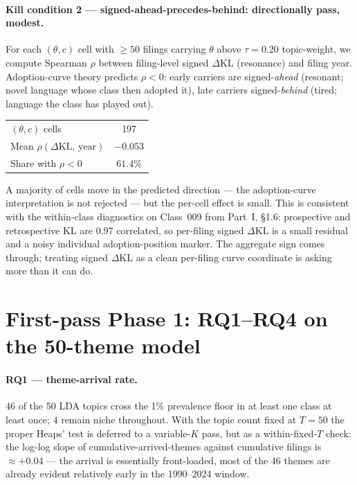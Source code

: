 \documentclass[11pt]{report}
\begin{document}
\paragraph{Kill condition 2 --- signed-ahead-precedes-behind: directionally pass, modest.}
For each $(\theta, c)$ cell with $\geq 50$ filings carrying $\theta$ above
$\tau = 0.20$ topic-weight, we compute Spearman $\rho$ between filing-level
signed $\Delta\mathrm{KL}$ (resonance) and filing year. Adoption-curve theory
predicts $\rho < 0$: early carriers are signed-\emph{ahead} (resonant; novel
language whose class then adopted it), late carriers signed-\emph{behind} (tired;
language the class has played out).

\begin{table}[h]\centering\small
\begin{tabular}{lc}
\toprule
$(\theta, c)$ cells & 197 \\
Mean $\rho(\Delta\mathrm{KL},\,\text{year})$ & $-0.053$ \\
Share with $\rho<0$ & $\mathbf{61.4\%}$ \\
\bottomrule
\end{tabular}
\end{table}

\noindent A majority of cells move in the predicted direction --- the
adoption-curve interpretation is not rejected --- but the per-cell effect is
small. This is consistent with the within-class diagnostics on Class~009 from
Part~I, §1.6: prospective and retrospective KL are 0.97 correlated, so
per-filing signed $\Delta\mathrm{KL}$ is a small residual and a noisy individual
adoption-position marker. The aggregate sign comes through; treating signed
$\Delta\mathrm{KL}$ as a clean per-filing curve coordinate is asking more than
it can do.

\section{First-pass Phase 1: RQ1--RQ4 on the 50-theme model}

\paragraph{RQ1 --- theme-arrival rate.} 46 of the 50 LDA topics cross the 1\%
prevalence floor in at least one class at least once; 4 remain niche
throughout. With the topic count fixed at $T = 50$ the proper Heaps' test is
deferred to a variable-$K$ pass, but as a within-fixed-$T$ check: the log-log
slope of cumulative-arrived-themes against cumulative filings is $\approx
+0.04$ --- the arrival is essentially front-loaded, most of the 46 themes are
already evident relatively early in the 1990--2024 window.
\end{document}
